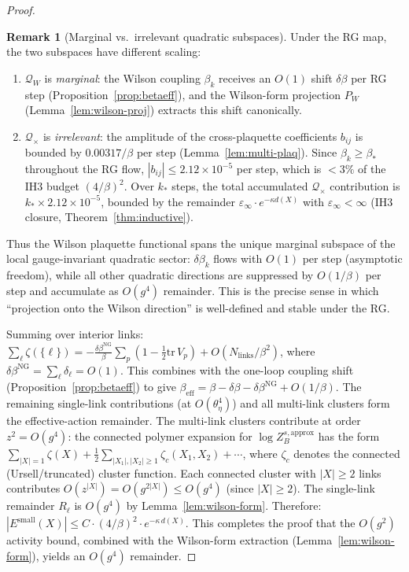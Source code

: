 \documentclass[11pt]{article}
\theoremstyle{definition}
\newtheorem{remark}[theorem]{Remark}
\newcommand{\tr}{\mathrm{tr}}
\begin{document}
\begin{proof}
\begin{remark}[Marginal vs.\ irrelevant quadratic
subspaces]\label{rem:marginal}
Under the RG map, the two subspaces have different scaling:
\begin{enumerate}[nosep,label=(\roman*)]
\item $\mathcal{Q}_W$ is \emph{marginal}: the Wilson coupling
$\beta_k$ receives an $O(1)$ shift $\delta\beta$ per RG step
(Proposition~\ref{prop:betaeff}), and the Wilson-form
projection $P_W$ (Lemma~\ref{lem:wilson-proj}) extracts this
shift canonically.
\item $\mathcal{Q}_\times$ is \emph{irrelevant}: the amplitude
of the cross-plaquette coefficients $b_{ij}$ is bounded by
$0.00317/\beta$ per step (Lemma~\ref{lem:multi-plaq}).
Since $\beta_k\ge\beta_*$ throughout the RG flow,
$|b_{ij}|\le 2.12\times 10^{-5}$ per step, which is $<3\%$
of the IH3 budget $(4/\beta)^2$.  Over $k_*$ steps, the total
accumulated $\mathcal{Q}_\times$ contribution is
$k_*\times 2.12\times 10^{-5}$, bounded by the remainder
$\varepsilon_\infty\cdot e^{-\kappa d(X)}$ with $\varepsilon_\infty<\infty$
(IH3 closure, Theorem~\ref{thm:inductive}).
\end{enumerate}
Thus the Wilson plaquette functional spans the unique marginal
subspace of the local gauge-invariant quadratic sector:
$\delta\beta_k$ flows with $O(1)$ per step (asymptotic freedom),
while all other quadratic directions are suppressed by
$O(1/\beta)$ per step and accumulate as $O(g^4)$ remainder.
This is the precise sense in which ``projection onto the
Wilson direction'' is well-defined and stable under the RG.
\end{remark}

Summing over interior links:
$\sum_\ell\zeta(\{\ell\})
=-\frac{\delta\beta^{\mathrm{NG}}}{\beta}\sum_p
(1-\frac{1}{2}\tr\,V_p)+O(N_{\mathrm{links}}/\beta^2)$,
where $\delta\beta^{\mathrm{NG}}=\sum_\ell\delta_\ell=O(1)$.
This combines with the one-loop coupling shift
(Proposition~\ref{prop:betaeff}) to give
$\beta_{\mathrm{eff}}=\beta-\delta\beta-\delta\beta^{\mathrm{NG}}
+O(1/\beta)$.
The remaining single-link contributions (at $O(\theta_\eta^4)$)
and all multi-link clusters form the
effective-action remainder.  The multi-link clusters contribute
at order $z^2=O(g^4)$: the connected polymer expansion for
$\log Z_B^{s,\mathrm{approx}}$ has the form
$\sum_{|X|=1}\zeta(X)+\frac{1}{2}\sum_{|X_1|,|X_2|\ge 1}
\zeta_c(X_1,X_2)+\cdots$, where $\zeta_c$ denotes the
connected (Ursell/truncated) cluster function.  Each connected
cluster with $|X|\ge 2$ links contributes $O(z^{|X|})
=O(g^{2|X|})\le O(g^4)$ (since $|X|\ge 2$).  The single-link
remainder $R_\ell$ is $O(g^4)$ by Lemma~\ref{lem:wilson-form}.
Therefore:
$|E^{\mathrm{small}}(X)|\le C\cdot(4/\beta)^2
\cdot e^{-\kappa\,d(X)}$.
This completes the proof that the $O(g^2)$ activity bound,
combined with the Wilson-form extraction
(Lemma~\ref{lem:wilson-form}), yields an $O(g^4)$ remainder.
\end{proof}
\end{document}

